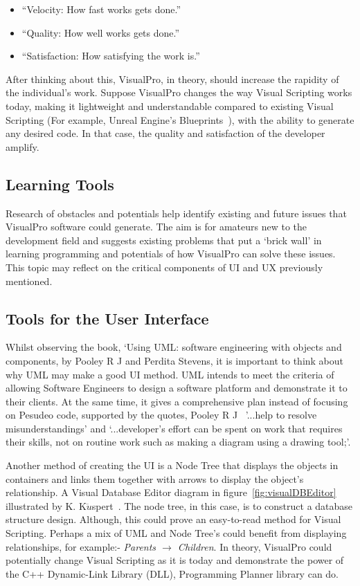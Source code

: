 \documentclass[12pt]{report} %
\begin{document}
			\begin{itemize}
			\item ``Velocity: How fast works gets done.''
			\item ``Quality: How well works gets done.''
			\item ``Satisfaction: How satisfying the work is.''
			\end{itemize}
	
			After thinking about this, VisualPro, in theory, should increase the rapidity of the individual’s work. Suppose VisualPro changes the way Visual Scripting works today, making it lightweight and understandable compared to existing Visual Scripting (For example, Unreal Engine's Blueprints~\cite{unreal_engine_introduction_nodate}), with the ability to generate any desired code. In that case, the quality and satisfaction of the developer amplify.

		\subsection{Learning Tools}
			Research of obstacles and potentials help identify existing and future issues that VisualPro software could generate. The aim is for amateurs new to the development field and suggests existing problems that put a `brick wall' in learning programming and potentials of how VisualPro can solve these issues. This topic may reflect on the critical components of UI and UX previously mentioned.

		\subsection{Tools for the User Interface}  
			Whilst observing the book, `Using UML: software engineering with objects and components, by Pooley R J and Perdita Stevens\cite{pooley_r_j_using_2006}, it is important to think about why UML may make a good UI method. UML intends to meet the criteria of allowing Software Engineers to design a software platform and demonstrate it to their clients. At the same time, it gives a comprehensive plan instead of focusing on Pesudeo code, supported by the quotes, Pooley R J~\cite{pooley_r_j_using_2006} '...help to resolve misunderstandings' and `...developer's effort can be spent on work that requires their skills, not on routine work such as making a diagram using a drawing tool;'.
			
			Another method of creating the UI is a Node Tree that displays the objects in containers and links them together with arrows to display the object's relationship. A Visual Database Editor diagram in figure~\ref{fig:visualDBEditor} illustrated by K. K${\ddot{u}}$spert~\cite{kuspert_design_1990}. The node tree, in this case, is to construct a database structure design. Although, this could prove an easy-to-read method for Visual Scripting. Perhaps a mix of UML and Node Tree's could benefit from displaying relationships, for example:- \textit{Parents ${\to}$ Children}. In theory, VisualPro could potentially change Visual Scripting as it is today and demonstrate the power of the C++ Dynamic-Link Library (DLL), Programming Planner library can do.
\end{document}
